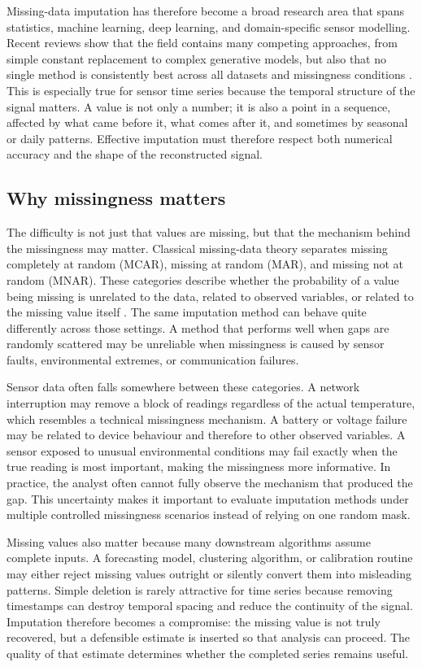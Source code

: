 Missing-data imputation has therefore become a broad research area that spans statistics, machine learning, deep learning, and domain-specific sensor modelling. Recent reviews show that the field contains many competing approaches, from simple constant replacement to complex generative models, but also that no single method is consistently best across all datasets and missingness conditions \cite{Adnan2022ARO,Alwateer2024MissingDI,Fan2025AnIA,Miao2023AnES}. This is especially true for sensor time series because the temporal structure of the signal matters. A value is not only a number; it is also a point in a sequence, affected by what came before it, what comes after it, and sometimes by seasonal or daily patterns. Effective imputation must therefore respect both numerical accuracy and the shape of the reconstructed signal.

\subsection{Why missingness matters}
The difficulty is not just that values are missing, but that the mechanism behind the missingness may matter. Classical missing-data theory separates missing completely at random (MCAR), missing at random (MAR), and missing not at random (MNAR). These categories describe whether the probability of a value being missing is unrelated to the data, related to observed variables, or related to the missing value itself \cite{Little2019,Jamshidian2014,Pham2022}. The same imputation method can behave quite differently across those settings. A method that performs well when gaps are randomly scattered may be unreliable when missingness is caused by sensor faults, environmental extremes, or communication failures.

Sensor data often falls somewhere between these categories. A network interruption may remove a block of readings regardless of the actual temperature, which resembles a technical missingness mechanism. A battery or voltage failure may be related to device behaviour and therefore to other observed variables. A sensor exposed to unusual environmental conditions may fail exactly when the true reading is most important, making the missingness more informative. In practice, the analyst often cannot fully observe the mechanism that produced the gap. This uncertainty makes it important to evaluate imputation methods under multiple controlled missingness scenarios instead of relying on one random mask.

Missing values also matter because many downstream algorithms assume complete inputs. A forecasting model, clustering algorithm, or calibration routine may either reject missing values outright or silently convert them into misleading patterns. Simple deletion is rarely attractive for time series because removing timestamps can destroy temporal spacing and reduce the continuity of the signal. Imputation therefore becomes a compromise: the missing value is not truly recovered, but a defensible estimate is inserted so that analysis can proceed. The quality of that estimate determines whether the completed series remains useful.


